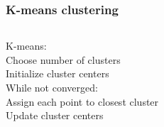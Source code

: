 \begin{frame}[fragile]
  \frametitle{K-means clustering}

  \begin{center}

    \begin{columns}[c]
      
        K-means: \\
        \alert<1>{Choose number of clusters} \\
        \alert<1>{Initialize cluster centers} \\
        While not converged: \\
          \alert<2,4>{\hskip10pt Assign each point to closest cluster} \\
          \alert<3,5>{\hskip10pt Update cluster centers}



\end{columns}
\end{center}
\end{frame}
